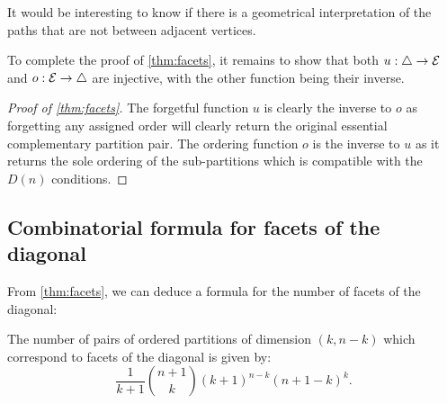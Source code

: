 \begin{rem}
    It would be interesting to know if there is a geometrical interpretation of the paths that are not between adjacent vertices. 
\end{rem}

To complete the proof of \cref{thm:facets}, it remains to show that both $u:\triangle \to \mathcal{E}$ and $o:\mathcal{E}\to \triangle$ are injective, with the other function being their inverse.

\begin{proof}[{Proof of \cref{thm:facets}}]
The forgetful function $u$ is clearly the inverse to $o$ as forgetting any assigned order will clearly return the original essential complementary partition pair. 
The ordering function $o$ is the inverse to $u$ as it returns the sole ordering of the sub-partitions which is compatible with the $D(n)$ conditions.
\end{proof}

\subsection{Combinatorial formula for facets of the diagonal}

From \cref{thm:facets}, we can deduce a formula for the number of facets of the diagonal:

\begin{proposition}
The number of pairs of ordered partitions of dimension $(k,n-k)$ which correspond to facets of the diagonal is given by: 
\begin{equation}
\frac{1}{k+1}\binom{n+1}{k}(k+1)^{n-k}(n+1-k)^{k}.
\end{equation}
\end{proposition}

